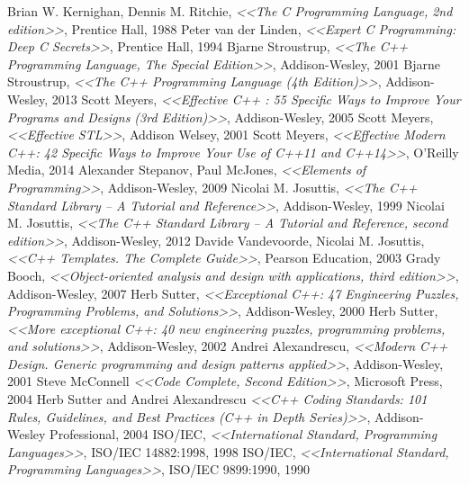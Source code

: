 \documentclass[a4paper,12pt,oneside]{article}
\begin{document}
\pagebreak
{}
\begin{thebibliography}{99}
 Brian W. Kernighan, Dennis M. Ritchie, \textit{<<The C Programming Language, 2nd edition>>}, Prentice Hall, 1988
 Peter van der Linden, \textit{<<Expert C Programming: Deep C Secrets>>}, Prentice Hall, 1994
 Bjarne Stroustrup, \textit{<<The C++ Programming Language, The Special Edition>>}, Addison-Wesley, 2001
 Bjarne Stroustrup, \textit{<<The C++ Programming Language (4th Edition)>>}, Addison-Wesley, 2013
 Scott Meyers, \textit{<<Effective C++ : 55 Specific Ways to Improve Your Programs and Designs (3rd Edition)>>}, Addison-Wesley, 2005
 Scott Meyers, \textit{<<Effective STL>>}, Addison Welsey, 2001
 Scott Meyers, \textit{<<Effective Modern C++: 42 Specific Ways to Improve Your Use of C++11 and C++14>>}, O'Reilly Media, 2014
 Alexander Stepanov, Paul McJones, \textit{<<Elements of Programming>>}, Addison-Wesley, 2009
 Nicolai M. Josuttis, \textit{<<The C++ Standard Library -- A Tutorial and Reference>>}, Addison-Wesley, 1999
 Nicolai M. Josuttis, \textit{<<The C++ Standard Library -- A Tutorial and Reference, second edition>>}, Addison-Wesley, 2012
 Davide Vandevoorde, Nicolai M. Josuttis, \textit{<<C++ Templates. The Complete Guide>>}, Pearson Education, 2003
 Grady Booch, \textit{<<Object-oriented analysis and design with applications, third edition>>}, Addison-Wesley, 2007
 Herb Sutter, \textit{<<Exceptional C++: 47 Engineering Puzzles, Programming Problems, and Solutions>>}, Addison-Wesley, 2000
 Herb Sutter, \textit{<<More exceptional C++: 40 new engineering puzzles, programming problems, and solutions>>}, Addison-Wesley, 2002
 Andrei Alexandrescu, \textit{<<Modern C++ Design. Generic programming and design patterns applied>>}, Addison-Wesley, 2001
 Steve McConnell \textit{<<Code Complete, Second Edition>>}, Microsoft Press, 2004
 Herb Sutter and Andrei Alexandrescu \textit{<<C++ Coding Standards: 101 Rules, Guidelines, and Best Practices (C++ in Depth Series)>>}, Addison-Wesley Professional, 2004
 ISO/IEC, \textit{<<International Standard, Programming Languages>>}, ISO/IEC 14882:1998, 1998
 ISO/IEC, \textit{<<International Standard, Programming Languages>>}, ISO/IEC 9899:1990, 1990

\end{thebibliography}
\end{document}
